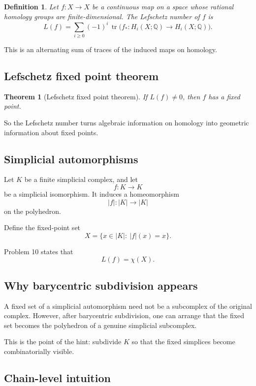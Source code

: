 \documentclass[12pt,a4paper]{article}
\newcommand{\Q}{\mathbb{Q}}
\newcommand{\Chi}{\chi}
\newtheorem{theorem}{Theorem}
\theoremstyle{notespace}
\newtheorem{definition}{Definition}[section]
\begin{document}
	\begin{definition}
		Let $f:X\to X$ be a continuous map on a space whose rational homology groups are finite-dimensional. The \emph{Lefschetz number} of $f$ is
		\[
		L(f)=\sum_{i\ge 0}(-1)^i\,\operatorname{tr}\!\bigl(f_*:H_i(X;\Q)\to H_i(X;\Q)\bigr).
		\]
	\end{definition}
	
	This is an alternating sum of traces of the induced maps on homology.
	
	\subsection{Lefschetz fixed point theorem}
	
	\begin{theorem}[Lefschetz fixed point theorem]
		If $L(f)\neq 0$, then $f$ has a fixed point.
	\end{theorem}
	
	So the Lefschetz number turns algebraic information on homology into geometric information about fixed points.
	
	\subsection{Simplicial automorphisms}
	
	Let $K$ be a finite simplicial complex, and let
	\[
	f:K\to K
	\]
	be a simplicial isomorphism. It induces a homeomorphism
	\[
	|f|:|K|\to |K|
	\]
	on the polyhedron.
	
	Define the fixed-point set
	\[
	X=\{x\in |K|:\ |f|(x)=x\}.
	\]
	
	Problem 10 states that
	\[
	L(f)=\Chi(X).
	\]
	
	\subsection{Why barycentric subdivision appears}
	
	A fixed set of a simplicial automorphism need not be a subcomplex of the original complex. However, after barycentric subdivision, one can arrange that the fixed set becomes the polyhedron of a genuine simplicial subcomplex.
	
	This is the point of the hint: subdivide $K$ so that the fixed simplices become combinatorially visible.
	
	\subsection{Chain-level intuition}
	
\end{document}

